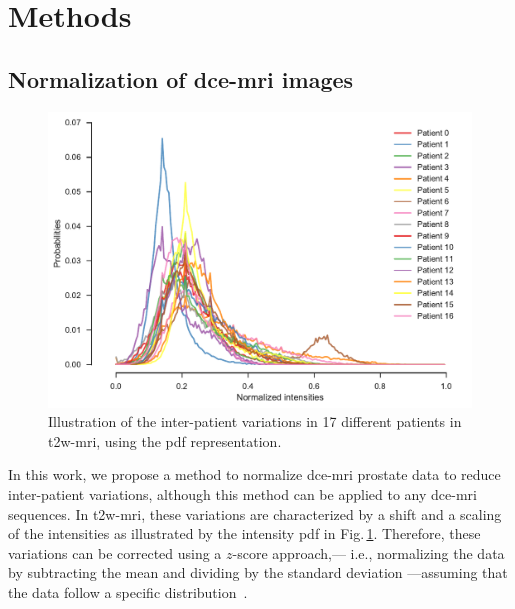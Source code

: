 \section{Methods}\label{sec:method}

\subsection{Normalization of \ac{dce}-\ac{mri} images}\label{sec:norm}

\begin{figure}
  \centering
  \includegraphics[width=0.7\linewidth]{02_methods/figures/t2w.pdf}
  \caption{Illustration of the inter-patient variations in 17
    different patients in \acs*{t2w}-\acs*{mri}, using the \acs*{pdf}
    representation.}
  \label{fig:t2w}
\end{figure}

In this work, we propose a method to normalize \ac{dce}-\ac{mri}
prostate data to reduce inter-patient variations, although this method can be applied to any \ac{dce}-\ac{mri} sequences.
In \ac{t2w}-\ac{mri}, these variations are characterized by a shift and a scaling of the intensities as illustrated by the intensity \ac{pdf} in Fig.\,\ref{fig:t2w}.
Therefore, these variations can be corrected using a $z$-score approach,--- i.e., normalizing the data by subtracting the mean and dividing by the standard deviation ---assuming that the data follow a specific distribution~\cite{lemaitre2016normalization}.

